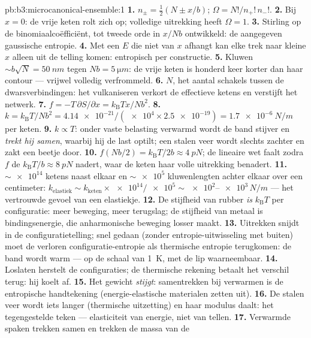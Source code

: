 \begin{solution}{pb:b3:microcanonical-ensemble:1}
\textbf{1.} $n_\pm = \tfrac12(N \pm x/b)$; $\Omega =
N!/n_+!\,n_-!$.
\textbf{2.} Bij $x = 0$: de vrije keten rolt zich op; volledige uitrekking
heeft $\Omega = 1$.
\textbf{3.} Stirling op de binomiaalcoëfficiënt, tot tweede orde in $x/Nb$
ontwikkeld: de aangegeven gaussische entropie.
\textbf{4.} Met een $E$ die niet van $x$ afhangt kan elke trek naar kleine
$x$ alleen uit de telling komen: entropisch per constructie.
\textbf{5.} Kluwen $\sim b\sqrt N = \qty{50}{nm}$ tegen $Nb =
\qty{5}{\micro m}$: de vrije keten is honderd keer korter dan haar contour
--- vrijwel volledig verfrommeld.
\textbf{6.} $N$, het aantal schakels tussen de dwarsverbindingen: het
vulkaniseren verkort de effectieve ketens en verstijft het netwerk.
\textbf{7.} $f = -T\,\partial S/\partial x =
k_{\text{B}}Tx/Nb^2$.
\textbf{8.} $k = k_{\text{B}}T/Nb^2 = \num{4.14e-21}/(\num{e4}
\times \num{2.5e-19}) = \qty{1.7e-6}{N/m}$ per keten.
\textbf{9.} $k \propto T$: onder vaste belasting verwarmd wordt de band
stijver en \emph{trekt hij samen}, waarbij hij de last optilt; een stalen
veer wordt slechts zachter en zakt een beetje door.
\textbf{10.} $f(Nb/2) = k_{\text{B}}T/2b \approx \qty{4}{pN}$; de lineaire
wet faalt zodra $f$ de $k_{\text{B}}T/b \approx
\qty{8}{pN}$ nadert, waar
de keten haar volle uitrekking benadert.
\textbf{11.} $\sim\num{e14}$ ketens naast elkaar en $\sim\num{e5}$
kluwenlengten achter elkaar over een centimeter: $k_{\text{elastiek}} \sim k_{\text{keten}} \times \num{e14}/\num{e5}
\sim \num{e2}$--$\num{e3}\,\unit{N/m}$ --- het vertrouwde gevoel van een
elastiekje.
\textbf{12.} De stijfheid van rubber \emph{is} $k_{\text{B}}T$ per
configuratie: meer beweging, meer terugslag; de stijfheid van metaal is
bindingsenergie, die anharmonische beweging losser maakt.
\textbf{13.} Uitrekken snijdt in de configuratietelling; snel gedaan
(zonder entropie-uitwisseling met buiten) moet de verloren
configuratie-entropie als thermische entropie terugkomen: de band wordt
warm --- op de schaal van \qty{1}{K}, met de lip waarneembaar.
\textbf{14.} Loslaten herstelt de configuraties; de thermische rekening
betaalt het verschil terug: hij koelt af.
\textbf{15.} Het gewicht \emph{stijgt}: samentrekken bij verwarmen is de
entropische handtekening (energie-elastische materialen zetten uit).
\textbf{16.} De stalen veer wordt iets langer (thermische uitzetting) en
haar modulus daalt: het tegengestelde teken --- elasticiteit van energie,
niet van tellen.
\textbf{17.} Verwarmde spaken trekken samen en trekken de massa van de

\end{solution}
